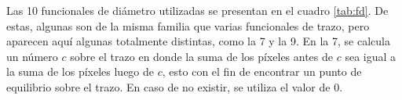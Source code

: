 

Las 10 funcionales de diámetro utilizadas se presentan en el cuadro \ref{tab:fd}.
De estas, algunas son de la misma familia que varias funcionales de trazo, pero aparecen aquí algunas totalmente distintas, como la 7 y la 9. En la 7, se calcula un número $c$ sobre el trazo en donde la suma de los píxeles antes de $c$ sea igual a la suma de los píxeles luego de $c$, esto con el fin de encontrar un punto de equilibrio sobre el trazo. En caso de no existir, se utiliza el valor de 0.\\

